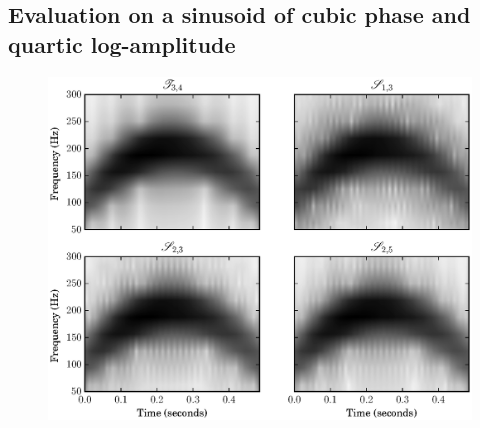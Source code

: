 \subsection{Evaluation on a sinusoid of cubic phase and quartic log-amplitude \label{sec:evalcubicphase}}

\begin{figure}[!t]
    \centering
    \includegraphics[width=\figwidthscale\textwidth]{plots/mq_mod_err_comp_all_spect.eps}
\end{figure}

